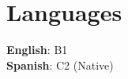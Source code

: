 \documentclass[letterpaper,11pt]{article}
\begin{document}
\section{Languages}
 \begin{itemize}[leftmargin=0.15in, label={}]
    \small{\item{
     \textbf{English}{: B1} \\
     \textbf{Spanish}{: C2 (Native)} \\
    }}
 \end{itemize}

\end{document}
